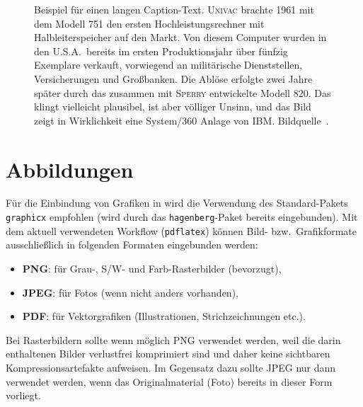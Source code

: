 \begin{figure}
\centering
{}  %
\caption{Beispiel für einen langen Caption-Text. \textsc{Univac}
brachte 1961 mit dem Modell 751 den ersten Hochleistungsrechner
mit Halbleiterspeicher auf den Markt. Von diesem Computer wurden
in den U.S.A.\ bereits im ersten Produktionsjahr über fünfzig
Exemplare verkauft, vorwiegend an militärische Dienststellen,
Versicherungen und Großbanken. Die Ablöse erfolgte zwei Jahre
später durch das zusammen mit \textsc{Sperry} entwickelte Modell 820.
Das klingt vielleicht plausibel, ist aber völliger Unsinn, und das
Bild zeigt in Wirklichkeit eine System/360 Anlage von IBM. 
Bildquelle~\cite{IBM360}.} 
\label{fig:ibm360}
\end{figure}





\section{Abbildungen}

Für die Einbindung von Grafiken in \latex wird die Verwendung des Stan\-dard-Pakets
\texttt{graphicx} \cite{Carlisle2014} empfohlen 
(wird durch das \texttt{hagenberg}-Paket bereits eingebunden). 
Mit dem aktuell verwendeten Workflow (\texttt{pdflatex})
können Bild- bzw.\ Grafikformate ausschließlich 
in folgenden Formaten eingebunden werden:
%
\begin{itemize}
	\item \textbf{PNG}: für Grau-, S/W- und Farb-Rasterbilder (bevorzugt),
	\item \textbf{JPEG}: für Fotos (wenn nicht anders vorhanden),
	\item \textbf{PDF}: für Vektorgrafiken (Illustrationen, Strichzeichnungen etc.).
\end{itemize}
%
Bei Rasterbildern sollte wenn möglich PNG verwendet werden, weil die darin 
enthaltenen Bilder verlustfrei komprimiert sind und daher keine sichtbaren Kompressionsartefakte
aufweisen. Im Gegensatz dazu sollte JPEG nur dann verwendet werden, wenn das Originalmaterial
(Foto) bereits in dieser Form vorliegt.


